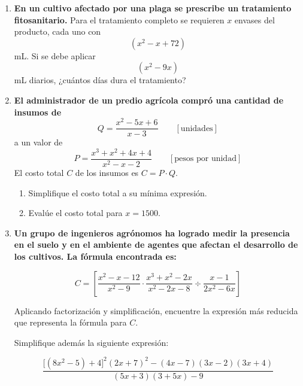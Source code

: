 \documentclass[12pt]{article}
\begin{document}
\begin{enumerate}
		\item \textbf{En un cultivo afectado por una plaga se prescribe un tratamiento fitosanitario.} Para el tratamiento completo se requieren \(x\) envases del producto, cada uno con
		\[
		(x^2-x+72)
		\]
		mL. Si se debe aplicar
		\[
		(x^2-9x)
		\]
		mL diarios, ¿cuántos días dura el tratamiento?
		
		\item \textbf{El administrador de un predio agrícola compró una cantidad de insumos de}
		\[
		Q=\frac{x^2-5x+6}{x-3}
		\qquad [\text{unidades}]
		\]
		a un valor de
		\[
		P=\frac{x^3+x^2+4x+4}{x^2-x-2}
		\qquad [\text{pesos por unidad}]
		\]
		El costo total \(C\) de los insumos es \(C=P\cdot Q\).
		
		\begin{enumerate}[label=\alph*)]
			\item Simplifique el costo total a su mínima expresión.
			\item Evalúe el costo total para \(x=1500\).
		\end{enumerate}
		
		\item \textbf{Un grupo de ingenieros agrónomos ha logrado medir la presencia en el suelo y en el ambiente de agentes que afectan el desarrollo de los cultivos. La fórmula encontrada es:}
		
		\[
		C=\left[
		\frac{x^2-x-12}{x^2-9}
		\cdot
		\frac{x^3+x^2-2x}{x^2-2x-8}
		\div
		\frac{x-1}{2x^2-6x}
		\right]
		\]
		
		Aplicando factorización y simplificación, encuentre la expresión más reducida que representa la fórmula para \(C\).
		
		\vspace{0.3cm}
		
		Simplifique además la siguiente expresión:
		
		\[
		\frac{\bigl[(8x^2-5)+4\bigr]^2(2x+7)^2-(4x-7)(3x-2)(3x+4)}
		{(5x+3)(3+5x)-9}
		\]
		
	\end{enumerate}
	
\end{document}
